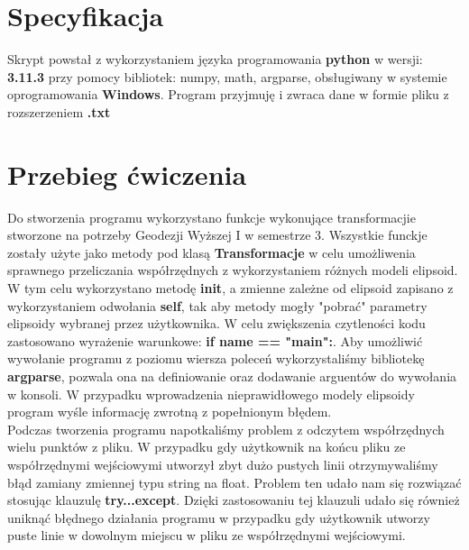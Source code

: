 \section{Specyfikacja}

\begin{flushleft}
	\hspace{1cm}Skrypt powstał z wykorzystaniem języka programowania \textbf{python} w wersji: \textbf{3.11.3} przy pomocy bibliotek: numpy, math, argparse, obsługiwany w systemie oprogramowania \textbf{Windows}. Program przyjmuję i zwraca dane w formie pliku z rozszerzeniem \textbf{.txt}
\end{flushleft}

\section{Przebieg ćwiczenia}

\begin{flushleft}
	\hspace{1cm}Do stworzenia programu wykorzystano funkcje wykonujące transformacjie stworzone na potrzeby Geodezji Wyższej I w semestrze 3. Wszystkie funckje zostały użyte jako metody pod klasą \textbf{Transformacje} w celu umożliwenia sprawnego przeliczania współrzędnych z wykorzystaniem różnych modeli elipsoid. W tym celu wykorzystano metodę \textbf{init}, a zmienne zależne od elipsoid zapisano z wykorzystaniem odwołania \textbf{self}, tak aby metody mogły "pobrać" parametry elipsoidy wybranej przez użytkownika. W celu zwiększenia czytleności kodu zastosowano wyrażenie warunkowe: \textbf{if name == "main":}. Aby umożliwić wywołanie programu z poziomu wiersza poleceń wykorzystaliśmy bibliotekę \textbf{argparse}, pozwala ona na definiowanie oraz dodawanie arguentów do wywołania w konsoli. W przypadku wprowadzenia nieprawidłowego modely elipsoidy program wyśle informację zwrotną z popełnionym błędem.\\
	\hspace{1cm}Podczas tworzenia programu napotkaliśmy problem z odczytem współrzędnych wielu punktów z pliku. W przypadku gdy użytkownik na końcu pliku ze współrzędnymi wejściowymi utworzył zbyt dużo pustych linii otrzymywaliśmy błąd zamiany zmiennej typu string na float. Problem ten udało nam się rozwiązać stosując klauzulę \textbf{try...except}. Dzięki zastosowaniu tej klauzuli udało się również uniknąć błędnego działania programu w przypadku gdy użytkownik utworzy puste linie w dowolnym miejscu w pliku ze współrzędnymi wejściowymi.
\end{flushleft}

